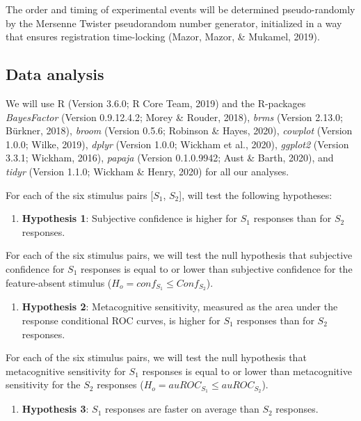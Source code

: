 \documentclass[
  english,
  man,floatsintext]{apa6}
\providecommand{\tightlist}{%
  \setlength{\itemsep}{0pt}\setlength{\parskip}{0pt}}
\begin{document}
The order and timing of experimental events will be determined pseudo-randomly by the Mersenne Twister pseudorandom number generator, initialized in a way that ensures registration time-locking (Mazor, Mazor, \& Mukamel, 2019).

\hypertarget{data-analysis}{%
\subsection{Data analysis}\label{data-analysis}}

We will use R (Version 3.6.0; R Core Team, 2019) and the R-packages \emph{BayesFactor} (Version 0.9.12.4.2; Morey \& Rouder, 2018), \emph{brms} (Version 2.13.0; Bürkner, 2018), \emph{broom} (Version 0.5.6; Robinson \& Hayes, 2020), \emph{cowplot} (Version 1.0.0; Wilke, 2019), \emph{dplyr} (Version 1.0.0; Wickham et al., 2020), \emph{ggplot2} (Version 3.3.1; Wickham, 2016), \emph{papaja} (Version 0.1.0.9942; Aust \& Barth, 2020), and \emph{tidyr} (Version 1.1.0; Wickham \& Henry, 2020) for all our analyses.

For each of the six stimulus pairs {[}\(S_1\), \(S_2\){]}, will test the following hypotheses:

\begin{enumerate}
\def\labelenumi{\arabic{enumi}.}
\tightlist
\item
  \textbf{Hypothesis 1}: Subjective confidence is higher for \(S_1\) responses than for \(S_2\) responses.
\end{enumerate}

For each of the six stimulus pairs, we will test the null hypothesis that subjective confidence for \(S_1\) responses is equal to or lower than subjective confidence for the feature-absent stimulus (\(H_o=conf_{S_1}\leq Conf_{S_2}\)).

\begin{enumerate}
\def\labelenumi{\arabic{enumi}.}
\setcounter{enumi}{1}
\tightlist
\item
  \textbf{Hypothesis 2}: Metacognitive sensitivity, measured as the area under the response conditional ROC curves, is higher for \(S_1\) responses than for \(S_2\) responses.
\end{enumerate}

For each of the six stimulus pairs, we will test the null hypothesis that metacognitive sensitivity for \(S_1\) responses is equal to or lower than metacognitive sensitivity for the \(S_2\) responses (\(H_o=auROC_{S_1}\leq auROC_{S_2}\)).

\begin{enumerate}
\def\labelenumi{\arabic{enumi}.}
\setcounter{enumi}{2}
\tightlist
\item
  \textbf{Hypothesis 3}: \(S_1\) responses are faster on average than \(S_2\) responses.
\end{enumerate}
\end{document}
